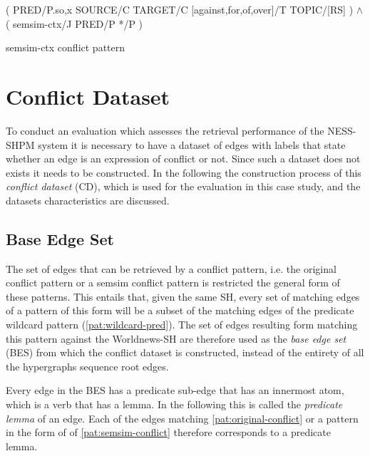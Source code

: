 \documentclass[11pt]{scrreprt}
\begin{document}
\begin{pattern}[H]
  \normalfont\sffamily
  \centering
  ( PRED/P.{so,x} SOURCE/C TARGET/C [against,for,of,over]/T TOPIC/[RS] ) \(\wedge\)\\ 
  ( semsim-ctx/J PRED/P */P )
  \caption{semsim-ctx conflict pattern}
  \label{pat:semsim-ctx-conflict}
\end{pattern}



\section{Conflict Dataset}
\label{sec:conflict-dataset}
To conduct an evaluation which assesses the retrieval performance of the NESS-SHPM system it is necessary to have a dataset of edges with labels that state whether an edge is an expression of conflict or not. Since such a dataset does not exists it needs to be constructed. In the following the construction process of this \textit{conflict dataset} (CD), which is used for the evaluation in this case study, and the datasets characteristics are discussed.


\subsection{Base Edge Set}
\label{sec:base-edge-set}
The set of edges that can be retrieved by a conflict pattern, i.e. the original conflict pattern or a semsim conflict pattern is restricted the general form of these patterns. This entails that, given the same SH, every set of matching edges of a pattern of this form will be a subset of the matching edges of the predicate wildcard pattern (\cref{pat:wildcard-pred}). The set of edges resulting form matching this pattern against the Worldnews-SH are therefore used as the \textit{base edge set} (BES) from which the conflict dataset is constructed, instead of the entirety of all the hypergraphs sequence root edges.

Every edge in the BES has a predicate sub-edge that has an innermost atom, which is a verb that has a lemma. In the following this is called the \textit{predicate lemma} of an edge. Each of the edges matching \cref{pat:original-conflict} or a pattern in the form of of \cref{pat:semsim-conflict} therefore corresponds to a predicate lemma.

\end{document}
